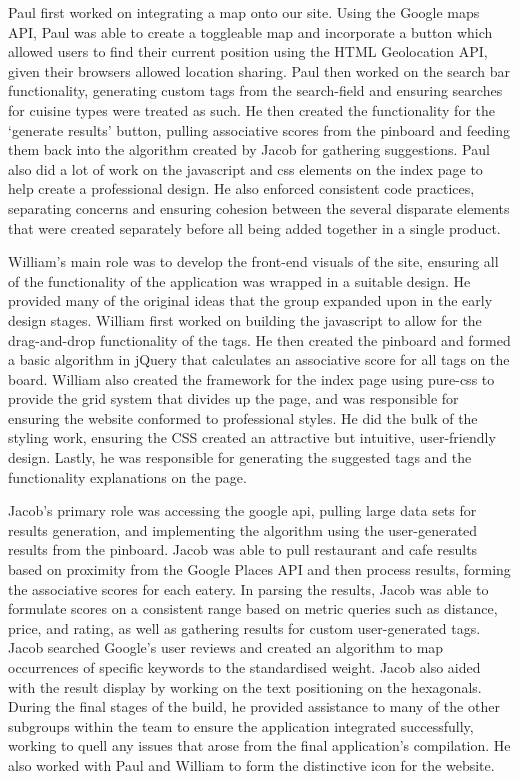 \documentclass[10pt,a4paper]{article}
\begin{document}
Paul first worked on integrating a map onto our site. Using the Google maps API, Paul was able to create a toggleable map and incorporate a button which allowed users to find their current position using the HTML Geolocation API, given their browsers allowed location sharing. Paul then worked on the search bar functionality, generating custom tags from the search-field and ensuring searches for cuisine types were treated as such. He then created the functionality for the ‘generate results’ button, pulling associative scores from the pinboard and feeding them back into the algorithm created by Jacob for gathering suggestions. Paul also did a lot of work on the javascript and css elements on the index page to help create a professional design. He also enforced  consistent code practices, separating concerns and ensuring cohesion between the several disparate elements that were created separately before all being added together in a single product.

William’s main role was to develop the front-end visuals of the site, ensuring all of the functionality of the application was wrapped in a suitable design. He provided many of the original ideas that the group expanded upon in the early design stages. William first worked on building the javascript to allow for the drag-and-drop functionality of the tags. He then created the pinboard and formed a basic algorithm in jQuery that calculates an associative score for all tags on the board. William also created the framework for the index page using pure-css to provide the grid system that divides up the page, and was responsible for ensuring the website conformed to professional styles. He did the bulk of the styling work, ensuring the CSS created an attractive but intuitive, user-friendly design. Lastly, he was responsible for generating the suggested tags and the functionality explanations on the page.

Jacob’s primary role was accessing the google api, pulling large data sets for results generation, and implementing the algorithm using the user-generated results from the pinboard. Jacob was able to pull restaurant and cafe results based on proximity from the Google Places API and then process results, forming the associative scores for each eatery. In parsing the results, Jacob was able to formulate scores on a consistent range based on metric queries such as distance, price, and rating, as well as gathering results for custom user-generated tags. Jacob searched Google’s user reviews and created an algorithm to map occurrences of specific keywords to the standardised weight. Jacob also aided with the result display by working on the text positioning on the hexagonals. During the final stages of the build, he provided assistance to many of the other subgroups within the team to ensure the application integrated successfully, working to quell any issues that arose from the final application’s compilation. He also worked with Paul and William to form the distinctive icon for the website.
\end{document}
